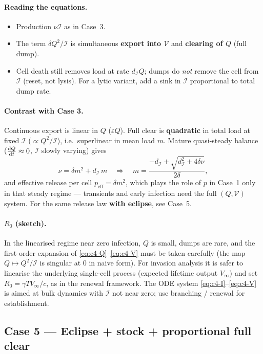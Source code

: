 \documentclass[11pt,a4paper]{article}
\newcommand{\dd}{{\rm d}}
\newcommand{\Icell}{\mathcal{I}}
\newcommand{\Vfree}{\mathcal{V}}
\newcommand{\ddt}[1]{\frac{\dd #1}{\dd t}}
\theoremstyle{plain}
\theoremstyle{definition}
\theoremstyle{remark}
\begin{document}
\paragraph{Reading the equations.}
\begin{itemize}
\item Production $\nu\Icell$ as in Case~3.
\item The term $\delta Q^2/\Icell$ is simultaneous \textbf{export into
$\Vfree$} and \textbf{clearing of $Q$} (full dump).
\item Cell death still removes load at rate $d_{\Icell}Q$; dumps do
\emph{not} remove the cell from $\Icell$ (reset, not lysis). For a lytic
variant, add a sink in $\Icell$ proportional to total dump rate.
\end{itemize}

\paragraph{Contrast with Case 3.}
Continuous export is linear in $Q$ ($\varepsilon Q$). Full clear is
\textbf{quadratic} in total load at fixed $\Icell$ ($\propto Q^2/\Icell$),
i.e.\ superlinear in mean load $m$. Mature quasi-steady balance
($\ddt Q\approx 0$, $\Icell$ slowly varying) gives
\[
\nu
=\delta m^2 + d_{\Icell}\,m
\quad\Rightarrow\quad
m
=\frac{-d_{\Icell}+\sqrt{d_{\Icell}^2+4\delta\nu}}{2\delta},
\]
and effective release per cell $p_{\mathrm{eff}}=\delta m^2$, which plays the
role of $p$ in Case~1 only in that steady regime --- transients and early
infection need the full $(Q,\Vfree)$ system. For the same release law
\textbf{with eclipse}, see Case~5.

\paragraph{$R_0$ (sketch).}
In the linearised regime near zero infection, $Q$ is small, dumps are rare, and
the first-order expansion of \eqref{eq:c4-Q}--\eqref{eq:c4-V} must be taken
carefully (the map $Q\mapsto Q^2/\Icell$ is singular at $0$ in naive form).
For invasion analysis it is safer to linearise the underlying single-cell
process (expected lifetime output $V_\infty$) and set
$R_0=\gamma T V_\infty/c$, as in the renewal framework. The ODE system
\eqref{eq:c4-I}--\eqref{eq:c4-V} is aimed at bulk dynamics with $\Icell$ not
near zero; use branching / renewal for establishment.

\subsection{Case 5 --- Eclipse + stock + proportional full clear}
\end{document}

